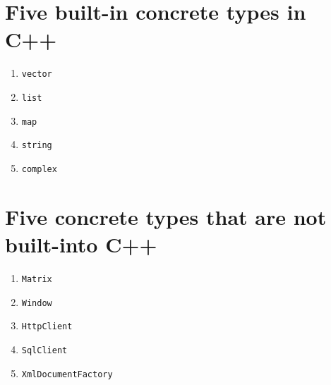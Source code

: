 \documentclass{article}
\begin{document}
 \section*{Five built-in concrete types in C++}
 \begin{enumerate}
  \item \texttt{vector}
  \item \texttt{list}
  \item \texttt{map}
  \item \texttt{string}
  \item \texttt{complex}
 \end{enumerate}

 
 \section*{Five concrete types that are not built-into C++}
 \begin{enumerate}
  \item \texttt{Matrix}
  \item \texttt{Window}
  \item \texttt{HttpClient}
  \item \texttt{SqlClient}
  \item \texttt{XmlDocumentFactory}
 \end{enumerate}
\end{document}

